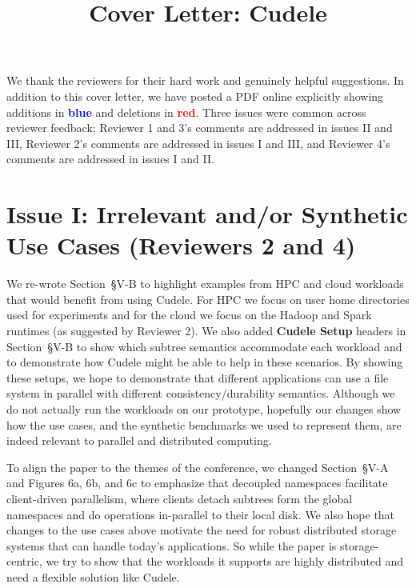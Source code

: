 \documentclass[onecolumn,conference]{IEEEtran}
\begin{document}
\title{Cover Letter: Cudele}
\maketitle

We thank the reviewers for their hard work and genuinely helpful suggestions.
In addition to this cover letter, we have posted a PDF online explicitly
showing additions in \textcolor{blue}{\textbf{blue}} and deletions in
\textcolor{red}{\textbf{red}}. Three issues were common across reviewer
feedback; Reviewer 1 and 3's comments are addressed in issues II and III,
Reviewer 2's comments are addressed in issues I and III, and Reviewer 4's
comments are addressed in issues I and II. 

\section*{Issue I: Irrelevant and/or Synthetic Use Cases (Reviewers 2 and 4)}

We re-wrote Section~{\S}V-B to highlight examples from HPC and cloud workloads
that would benefit from using Cudele. For HPC we focus on user home directories
used for experiments and for the cloud we focus on the Hadoop and Spark
runtimes (as suggested by Reviewer 2).  We also added \textbf{Cudele Setup}
headers in Section~{\S}V-B to show which subtree semantics accommodate each
workload and to demonstrate how Cudele might be able to help in these
scenarios.  By showing these setups, we hope to demonstrate that different
applications can use a file system in parallel with different
consistency/durability semantics.  Although we do not actually run the
workloads on our prototype, hopefully our changes show how the use cases, and
the synthetic benchmarks we used to represent them, are indeed relevant to
parallel and distributed computing.

To align the paper to the themes of the conference, we changed Section~{\S}V-A
and Figures 6a, 6b, and 6c to emphasize that decoupled namespaces facilitate
client-driven parallelism, where clients detach subtrees form the global namespaces
and do operations in-parallel to their local disk. We also hope that changes to
the use cases above motivate the need for robust distributed storage systems
that can handle today's applications.  So while the paper is storage-centric,
we try to show that the workloads it supports are highly distributed and need a
flexible solution like Cudele.  
\end{document}
